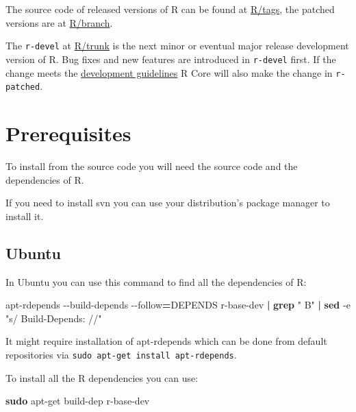 \documentclass[
]{book}
\newenvironment{Shaded}{\begin{snugshade}}{\end{snugshade}}
\newcommand{\AttributeTok}[1]{\textcolor[rgb]{0.13,0.29,0.53}{#1}}
\newcommand{\ExtensionTok}[1]{#1}
\newcommand{\FunctionTok}[1]{\textcolor[rgb]{0.13,0.29,0.53}{\textbf{#1}}}
\newcommand{\KeywordTok}[1]{\textcolor[rgb]{0.13,0.29,0.53}{\textbf{#1}}}
\newcommand{\NormalTok}[1]{#1}
\newcommand{\OperatorTok}[1]{\textcolor[rgb]{0.81,0.36,0.00}{\textbf{#1}}}
\newcommand{\StringTok}[1]{\textcolor[rgb]{0.31,0.60,0.02}{#1}}
\begin{document}
The source code of released versions of R can be found at \href{https://svn.r-project.org/R/tags/}{R/tags}, the patched versions are at \href{https://svn.r-project.org/R/branches/}{R/branch}.

The \texttt{r-devel} at \href{https://svn.r-project.org/R/trunk}{R/trunk} is the next minor or eventual major release development version of R.
Bug fixes and new features are introduced in \texttt{r-devel} first.
If the change meets the \href{https://developer.r-project.org/devel-guidelines.txt}{development guidelines} R Core will also make the change in \texttt{r-patched}.

\section{Prerequisites}\label{prerequisites}

To install from the source code you will need the source code and the dependencies of R.

If you need to install svn you can use your distribution's package manager to install it.

\subsection{Ubuntu}\label{ubuntu}

In Ubuntu you can use this command to find all the dependencies of R:

\begin{Shaded}
\begin{Highlighting}[]
\ExtensionTok{apt{-}rdepends} \AttributeTok{{-}{-}build{-}depends} \AttributeTok{{-}{-}follow}\OperatorTok{=}\NormalTok{DEPENDS r{-}base{-}dev }\KeywordTok{|} \FunctionTok{grep} \StringTok{" B"} \KeywordTok{|} \FunctionTok{sed} \AttributeTok{{-}e} \StringTok{"s/  Build{-}Depends: //"}
\end{Highlighting}
\end{Shaded}

It might require installation of apt-rdepends which can be done from default repositories via \texttt{sudo\ apt-get\ install\ apt-rdepends}.

To install all the R dependencies you can use:

\begin{Shaded}
\begin{Highlighting}[]
\FunctionTok{sudo}\NormalTok{ apt{-}get build{-}dep r{-}base{-}dev}
\end{Highlighting}
\end{Shaded}
\end{document}
